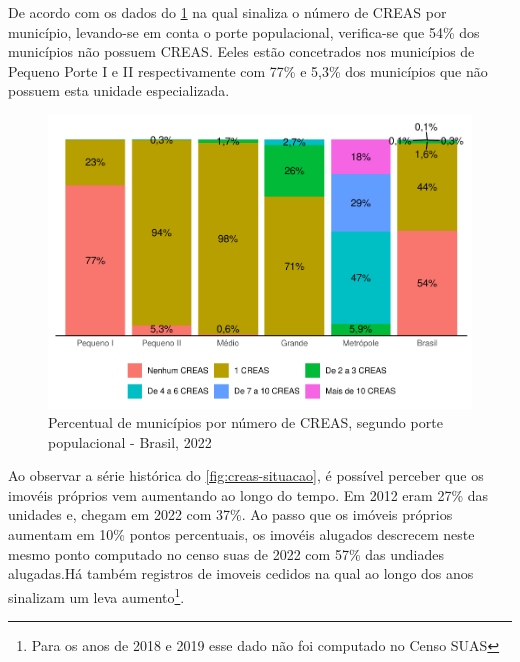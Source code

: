 \documentclass[
  brazilian]{report}
\begin{document}
De acordo com os dados do \cref{fig:CREAS-porte} na qual sinaliza o
número de CREAS por município, levando-se em conta o porte populacional,
verifica-se que 54\% dos municípios não possuem CREAS. Eeles estão
concetrados nos municípios de Pequeno Porte I e II respectivamente com
77\% e 5,3\% dos municípios que não possuem esta unidade especializada.

\begin{figure}
\includegraphics{Censo-SUAS-2022_files/figure-latex/CREAS-porte-1} \caption[Percentual de municípios por número de CREAS, segundo porte populacional - Brasil, 2022]{Percentual de municípios por número de CREAS, segundo porte populacional - Brasil, 2022}\label{fig:CREAS-porte}
\end{figure}

Ao observar a série histórica do \cref{fig:creas-situacao}, é possível
perceber que os imovéis próprios vem aumentando ao longo do tempo. Em
2012 eram 27\% das unidades e, chegam em 2022 com 37\%. Ao passo que os
imóveis próprios aumentam em 10\% pontos percentuais, os imovéis
alugados descrecem neste mesmo ponto computado no censo suas de 2022 com
57\% das undiades alugadas.Há também registros de imoveis cedidos na
qual ao longo dos anos sinalizam um leva
aumento\footnote{Para os anos de 2018 e 2019 esse dado não foi computado no Censo SUAS}.
\end{document}
